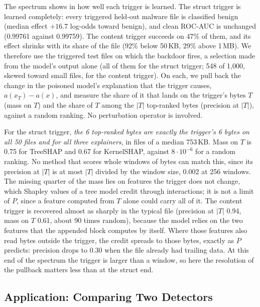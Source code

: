 The spectrum shows in how well each trigger is learned. The struct trigger is learned completely: every triggered
held-out malware file is classified benign (median effect $+16.7$ log-odds toward benign), and clean ROC-AUC is
unchanged (0.99761 against 0.99759). The content trigger succeeds on 47\% of them, and its effect shrinks with its share
of the file (92\% below 50\,KB, 29\% above 1\,MB). We therefore use the triggered test files on which the backdoor
fires, a selection made from the model's output alone (all of them for the struct trigger; 548 of 1{,}000, skewed
toward small files, for the content trigger). On each, we pull back the change in the poisoned model's explanation that
the trigger causes, $a(x_T) - a(x)$, and measure the share of it that lands on the trigger's bytes $T$ (mass on $T$) and
the share of $T$ among the $|T|$ top-ranked bytes (precision at $|T|$), against a random ranking. No perturbation
operator is involved.

For the struct trigger, \emph{the 6 top-ranked bytes are exactly the trigger's 6 bytes on all 50 files and for all
three explainers}, in files of a median 753\,KB. Mass on $T$ is 0.75 for TreeSHAP and 0.67 for KernelSHAP, against
$8 \cdot 10^{-6}$ for a random ranking. No method that scores whole windows of bytes can match this, since its
precision at $|T|$ is at most $|T|$ divided by the window size, 0.002 at 256 windows. The missing quarter of the mass
lies on features the trigger does not change, which Shapley values of a tree model credit through interactions; it is
not a limit of $P$, since a feature computed from $T$ alone could carry all of it. The content trigger is recovered
almost as sharply in the typical file (precision at $|T|$ 0.94, mass on $T$ 0.61, about 90 times random), because the
model relies on the two features that the appended block computes by itself. Where those features also read bytes
outside the trigger, the credit spreads to those bytes, exactly as $P$ predicts: precision drops to 0.30 when the file
already had trailing data. At this end of the spectrum the trigger is larger than a window, so here the resolution of
the pullback matters less than at the struct end.

\subsection{Application: Comparing Two Detectors}
\label{sec:XML:Comparison}

